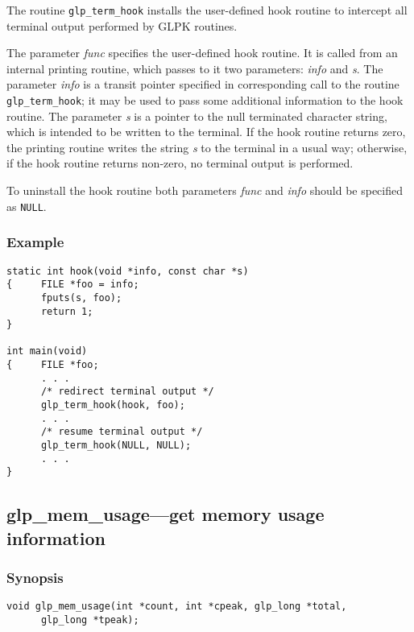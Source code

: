 The routine \verb|glp_term_hook| installs the user-defined hook routine
to intercept all terminal output performed by GLPK routines.


The parameter {\it func} specifies the user-defined hook routine. It is
called from an internal printing routine, which passes to it two
parameters: {\it info} and {\it s}. The parameter {\it info} is a
transit pointer specified in corresponding call to the routine
\verb|glp_term_hook|; it may be used to pass some additional information
to the hook routine. The parameter {\it s} is a pointer to the null
terminated character string, which is intended to be written to the
terminal. If the hook routine returns zero, the printing routine writes
the string {\it s} to the terminal in a usual way; otherwise, if the
hook routine returns non-zero, no terminal output is performed.

To uninstall the hook routine both parameters {\it func} and {\it info}
should be specified as \verb|NULL|.

\subsubsection*{Example}

\begin{verbatim}
static int hook(void *info, const char *s)
{     FILE *foo = info;
      fputs(s, foo);
      return 1;
}

int main(void)
{     FILE *foo;
      . . .
      /* redirect terminal output */
      glp_term_hook(hook, foo);
      . . .
      /* resume terminal output */
      glp_term_hook(NULL, NULL);
      . . .
}
\end{verbatim}

\subsection{glp\_mem\_usage---get memory usage information}

\subsubsection*{Synopsis}

\begin{verbatim}
void glp_mem_usage(int *count, int *cpeak, glp_long *total,
      glp_long *tpeak);
\end{verbatim}

